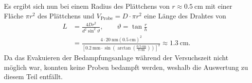 \documentclass[a4paper,twoside,final]{article}
\begin{document}
Es ergibt sich nun bei einem Radius des Plättchens von $r \approx \SI{0.5}{\centi\metre}$ mit einer Fläche $\pi r^2$ des Plättchens und $V_\text{Probe} = D\cdot\pi r^2$ eine Länge des Drahtes von
\begin{align}
  L &= \frac{4 D r^2}{d^2 \sin^2 \vartheta}, \qquad \vartheta = \tan\frac{r}{h}\\
    &= \frac{4\cdot\SI{20}{\nano\metre} (\SI{0.5}{\centi\metre})^2}{[\SI{0.2}{\milli\metre}\cdot\sin(\arctan(\frac{\SI{0.5}{\centi\metre}}{\SI{8}{\centi\metre}}))]^2} \approx \SI{1.3}{\centi\metre}.
\end{align}
Da das Evakuieren der Bedampfungsanlage während der Versuchszeit nicht möglich war, konnten keine Proben bedampft werden, weshalb die Auswertung zu diesem Teil entfällt.
\captionsetup[subfigure]{justification=justified,singlelinecheck=false} %
\end{document}

